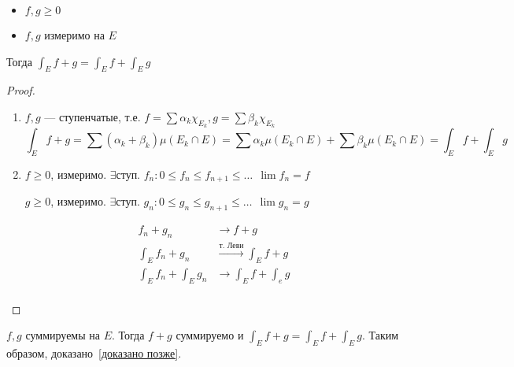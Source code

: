\begin{theorem}\itemfix
    \begin{itemize}
        \item \(f, g \geq 0\)
        \item \(f, g\) измеримо на \(E\)
    \end{itemize}
    Тогда \(\int_E f + g = \int_E f + \int_E g\)
\end{theorem}
\begin{proof}\itemfix
    \begin{enumerate}
        \item \(f, g\) --- ступенчатые, т.е. \(f = \sum \alpha_k \chi_{E_k}, g = \sum \beta_k \chi_{E_k}\)
              \[\int_E f + g = \sum (\alpha_k + \beta_k)\mu(E_k\cap E) = \sum \alpha_k \mu (E_k \cap E) + \sum \beta_k \mu (E_k \cap E) = \int_E f + \int_E g\]

        \item \(f \geq 0\), измеримо. \(\exists \text{ступ. } f_n : 0 \leq f_n \leq f_{n+1} \leq \dots \ \ \lim f_n = f\)

              \(g \geq 0\), измеримо. \(\exists \text{ступ. } g_n : 0 \leq g_n \leq g_{n+1} \leq \dots \ \ \lim g_n = g\)

              \begin{align*}
                  f_n + g_n               & \to f + g                                 \\
                  \int_E f_n + g_n        & \xrightarrow{\text{т. Леви}} \int_E f + g \\
                  \int_E f_n + \int_E g_n & \to \int_E f + \int_e g                   \\
              \end{align*}
    \end{enumerate}
\end{proof}

\begin{corollary}
    \(f, g\) суммируемы на \(E\). Тогда \(f + g\) суммируемо и \(\int_{E} f + g = \int_E f + \int_E g\). Таким образом, доказано~\ref{доказано позже}.
\end{corollary}


